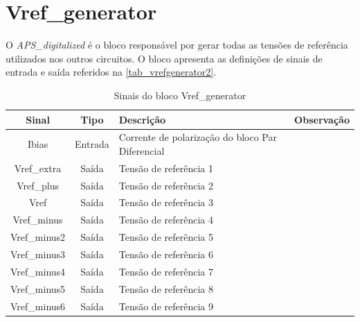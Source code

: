 \renewcommand{\NomeBloco}{Vref\_generator}
\renewcommand{\NomeBlocoNoUnderline}{vrefgenerator}
\renewcommand{\NomePTab}{tab_\NomeBlocoNoUnderline}
\renewcommand{\NomeSTab}{tab_\NomeBlocoNoUnderline2}
\renewcommand{\NomePFig}{fig_\NomeBlocoNoUnderline}
\renewcommand{\NomeSFig}{fig_\NomeBlocoNoUnderline2}
\renewcommand{\NomeTTab}{tab_\NomeBlocoNoUnderline3}
\renewcommand{\NomeQTab}{tab_\NomeBlocoNoUnderline4}

\section{\NomeBloco}

O \emph{APS\_digitalized} \'e o bloco respons\'avel por gerar todas as tens\~oes de refer\^encia utilizados nos outros circuitos. O bloco apresenta as defini{\c c}\~oes de sinais de entrada e sa\'ida referidos na \autoref{\NomeSTab}.

\begin{table}[htbp]
\caption{Sinais do bloco \NomeBloco}
\label{\NomeSTab}
\centering
\begin{tabular}{ccll}

    \toprule
    Sinal & Tipo    & Descri{\c c}\~ao & Observa{\c c}\~ao        \\
    \midrule \midrule
    Ibias   & Entrada   & Corrente de polariza{\c c}\~ao do bloco Par Diferencial \\
    \midrule
    Vref\_extra   & Saída   & Tens\~ao de refer\^encia 1 \\
    \midrule
    Vref\_plus   & Saída   & Tens\~ao de refer\^encia 2 \\
    \midrule
    Vref   & Saída   & Tens\~ao de refer\^encia 3 \\
    \midrule
    Vref\_minus   & Saída   & Tens\~ao de refer\^encia 4 \\
    \midrule
    Vref\_minus2   & Saída   & Tens\~ao de refer\^encia 5 \\
    \midrule
    Vref\_minus3   & Saída   & Tens\~ao de refer\^encia 6 \\
    \midrule
    Vref\_minus4  & Saída   & Tens\~ao de refer\^encia 7 \\
    \midrule
    Vref\_minus5   & Saída   & Tens\~ao de refer\^encia 8 \\
    \midrule
    Vref\_minus6   & Saída   & Tens\~ao de refer\^encia 9 \\
    \bottomrule
\end{tabular}
\end{table}


